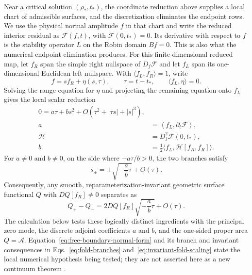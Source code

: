 \documentclass[11pt]{article}
\begin{document}
Near a critical solution $(\rho_*,t_*)$, the coordinate reduction above
supplies a local chart of admissible surfaces, and the discretization
eliminates the endpoint rows.  We use the physical normal amplitude $f$ in
that chart and write the reduced interior residual as
$\mathcal F(f,t)$, with $\mathcal F(0,t_*)=0$.  Its derivative with respect to
$f$ is the stability operator $L$ on the Robin domain $Bf=0$.  This is also
what the numerical endpoint elimination produces.  For this finite-dimensional
reduced map, let $f_R$ span the simple right nullspace of $D_f\mathcal F$ and
let $f_L$ span its one-dimensional Euclidean left nullspace.  With
$\langle f_L,f_R\rangle=1$, write
\begin{equation}
f=s f_R+\eta(s,\tau),
\qquad \tau=t-t_*,
\qquad \langle f_L,\eta\rangle=0.
\end{equation}
Solving the range equation for $\eta$ and projecting the remaining equation onto
$f_L$ gives the local scalar reduction
\begin{align}
0=a\tau+b s^2
+O\!\left(\tau^2+|\tau s|+|s|^3\right), \nonumber\\
a&=\left\langle f_L,\partial_t\mathcal F\right\rangle,
\nonumber\\
\mathcal H&=D_f^2\mathcal F(0,t_*), \nonumber\\
b&=\tfrac12\langle f_L,\mathcal H[f_R,f_R]\rangle.
\label{eq:free-boundary-normal-form}
\end{align}
For $a\neq0$ and $b\neq0$, on the side where $-a\tau/b>0$, the two branches satisfy
\begin{equation}
s_\pm=\pm\sqrt{-\frac{a}{b}\tau}+O(\tau).
\label{eq:fold-branches}
\end{equation}
Consequently, any smooth, reparameterization-invariant geometric surface
functional $Q$ with
$D Q[f_R]\neq0$ separates as
\begin{equation}
Q_+-Q_-
=2D Q[f_R]\sqrt{-\frac{a}{b}\tau}+O(\tau).
\label{eq:invariant-fold-scaling}
\end{equation}
The calculation below tests these logically distinct ingredients with the
principal zero mode, the discrete adjoint coefficients $a$ and $b$, and the one-sided
proper area $Q=\mathcal A$.  Equation~\eqref{eq:free-boundary-normal-form}
and its branch and invariant consequences in Eqs.~\eqref{eq:fold-branches}
and~\eqref{eq:invariant-fold-scaling} state the local numerical hypothesis
being tested; they are not asserted here as a new continuum theorem
\cite{Kuznetsov2004,BoothCoxOkpala2026}.
\end{document}
